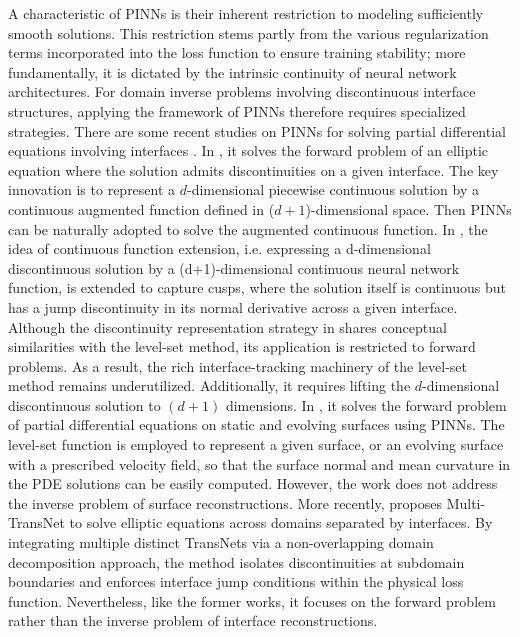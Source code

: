 \documentclass[final,hidelinks,onefignum,onetabnum]{siamart251216}
\begin{document}
A characteristic of PINNs is their inherent restriction to modeling sufficiently smooth solutions. This restriction stems partly from the various regularization terms incorporated into the loss function to ensure training stability; more fundamentally, it is dictated by the intrinsic continuity of neural network architectures. For domain inverse problems involving discontinuous interface structures, applying the framework of PINNs therefore requires specialized strategies. There are some recent studies on PINNs for solving partial differential equations involving interfaces \cite{hulinlai22,tselinhulai23,tselai23,hushilinlai24}. In \cite{hulinlai22}, it solves the forward problem of an elliptic equation where the solution admits discontinuities on a given interface. The key innovation is to represent a $d$-dimensional piecewise continuous solution by a continuous augmented function defined in ($d+1$)-dimensional space. Then PINNs can be naturally adopted to solve the augmented continuous function. In \cite{tselinhulai23,tselai23}, the idea of continuous function extension, i.e. expressing a d-dimensional discontinuous solution by a (d+1)-dimensional continuous neural network function, is extended to capture cusps, where the solution itself is continuous but has a jump discontinuity in its normal derivative across a given interface. Although the discontinuity representation strategy in \cite{hulinlai22,tselinhulai23,tselai23} shares conceptual similarities with the level-set method, its application is restricted to forward problems. As a result, the rich interface-tracking machinery of the level-set method remains underutilized. Additionally, it requires lifting the $d$-dimensional discontinuous solution to $(d+1)$ dimensions. In \cite{hushilinlai24}, it solves the forward problem of partial differential equations on static and evolving surfaces using PINNs. The level-set function is employed to represent a given surface, or an evolving surface with a prescribed velocity field, so that the surface normal and mean curvature in the PDE solutions can be easily computed. However, the work does not address the inverse problem of surface reconstructions. More recently, \cite{lujuzhu25} proposes Multi-TransNet to solve elliptic equations across domains separated by interfaces. By integrating multiple distinct TransNets via a non-overlapping domain decomposition approach, the method isolates discontinuities at subdomain boundaries and enforces interface jump conditions within the physical loss function. Nevertheless, like the former works, it focuses on the forward problem rather than the inverse problem of interface reconstructions.
\end{document}
